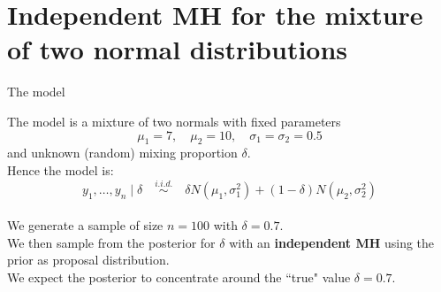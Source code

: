 %
%
%
%
%
%
%
%
%


\section{Independent MH for the mixture of two normal distributions}


\begin{frame}{The model}

The model is a mixture of two normals with fixed parameters\\
$$\mu_1=7, \quad \mu_2=10, \quad \sigma_1=\sigma_2=0.5$$
and unknown (random) mixing proportion $\delta$.\\
\vspace{.1in}
Hence the model is:
$$ y_1, \ldots, y_n \mid \delta \quad \overset{i.i.d.}{\sim} \quad \delta N(\mu_1,\sigma_1^2) + (1-\delta) N(\mu_2,\sigma_2^2)$$\\
\vspace{0.2in}
We generate a sample of size $n=100$ with $\delta=0.7$.\\
\vspace{0.1in}
We then sample from the posterior for $\delta$ with an \textbf{independent MH} using the prior as proposal distribution.\\
\vspace{0.1in}
We expect the posterior to concentrate around the ``true" value $\delta=0.7$.
 
\end{frame}


